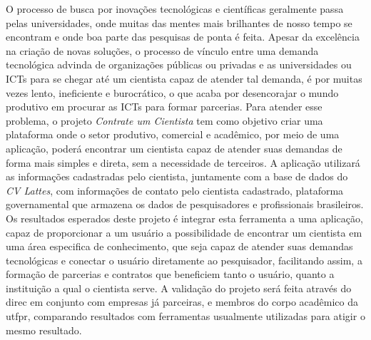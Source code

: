 \begin{resumoutfpr}
    O processo de busca por inovações tecnológicas e científicas geralmente passa pelas universidades, onde muitas das mentes mais brilhantes de nosso tempo se encontram e onde boa parte das pesquisas de ponta é feita. Apesar da excelência na criação de novas soluções, o processo de vínculo entre uma demanda tecnológica advinda de organizações públicas ou privadas e as universidades ou ICTs para se chegar até um cientista capaz de atender tal demanda, é por muitas vezes lento, ineficiente e burocrático, o que acaba por desencorajar o mundo produtivo em procurar as ICTs para formar parcerias. Para atender esse problema, o projeto \emph{Contrate um Cientista} tem como objetivo criar uma plataforma onde o setor produtivo, comercial e acadêmico, por meio de uma aplicação, poderá encontrar um cientista capaz de atender suas demandas de forma mais simples e direta, sem a necessidade de terceiros.
    A aplicação utilizará as informações cadastradas pelo cientista, juntamente com a base de dados do \emph{CV Lattes}, com informações de contato pelo cientista cadastrado, plataforma governamental que armazena os dados de pesquisadores e profissionais brasileiros. Os resultados esperados deste projeto é integrar esta ferramenta a uma aplicação, capaz de proporcionar a um usuário a possibilidade de encontrar um cientista em uma área especifica de conhecimento, que seja capaz de atender suas demandas tecnológicas e conectar o usuário diretamente ao pesquisador, facilitando assim, a formação de parcerias e contratos que beneficiem tanto o usuário, quanto a instituição a qual o cientista serve. A validação do projeto será feita através do \gls{direc} em conjunto com empresas já parceiras, e membros do corpo acadêmico da \gls{utfpr}, comparando resultados com ferramentas usualmente utilizadas para atigir o mesmo resultado.
\end{resumoutfpr}
